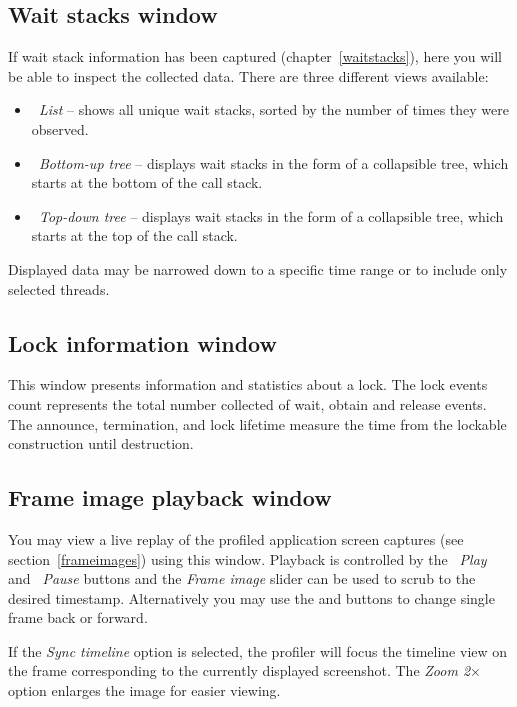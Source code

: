 \documentclass[hidelinks,titlepage,a4paper,twoside]{article}
\begin{document}
\subsection{Wait stacks window}
\label{waitstackswindow}

If wait stack information has been captured (chapter~\ref{waitstacks}), here you will be able to inspect the collected data. There are three different views available:

\begin{itemize}
\item \emph{\faTable{}~List} -- shows all unique wait stacks, sorted by the number of times they were observed.
\item \emph{\faTree{}~Bottom-up tree} -- displays wait stacks in the form of a collapsible tree, which starts at the bottom of the call stack.
\item \emph{\faTree{}~Top-down tree} -- displays wait stacks in the form of a collapsible tree, which starts at the top of the call stack.
\end{itemize}

Displayed data may be narrowed down to a specific time range or to include only selected threads.

\subsection{Lock information window}
\label{lockwindow}

This window presents information and statistics about a lock. The lock events count represents the total number collected of wait, obtain and release events. The announce, termination, and lock lifetime measure the time from the lockable construction until destruction.

\subsection{Frame image playback window}
\label{playback}

You may view a live replay of the profiled application screen captures (see section~\ref{frameimages}) using this window. Playback is controlled by the \emph{\faPlay~Play} and \emph{\faPause~Pause} buttons and the \emph{Frame image} slider can be used to scrub to the desired timestamp. Alternatively you may use the \emph{\faCaretLeft} and \emph{\faCaretRight} buttons to change single frame back or forward.

If the \emph{Sync timeline} option is selected, the profiler will focus the timeline view on the frame corresponding to the currently displayed screenshot. The \emph{Zoom 2$\times$} option enlarges the image for easier viewing.
\end{document}
